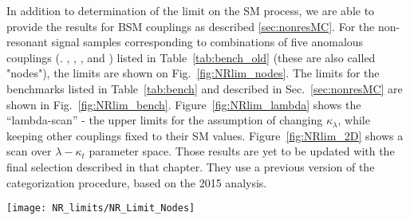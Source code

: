 

In addition to determination of the limit on the SM process, we are
able to provide the results for BSM couplings as described
\ref{sec:nonresMC}.  For the non-resonant signal samples corresponding
to combinations of five anomalous couplings (\kapl. \kapt, \ctwo,
\ctwog, and \cg) listed in Table~\ref{tab:bench_old} (these are also
called "nodes"), the limits are shown on Fig.~\ref{fig:NRlim_nodes}.
The limits for the benchmarks listed in Table~\ref{tab:bench} and
described in Sec.~\ref{sec:nonresMC} are shown in
Fig.~\ref{fig:NRlim_bench}.  Figure~\ref{fig:NRlim_lambda} shows the
``lambda-scan'' - the upper limits for the assumption of changing
$\kappa_\lambda$, while keeping other couplings fixed to their SM
values. Figure~\ref{fig:NRlim_2D} shows a scan over $\lambda-\kappa_t$
parameter space. 
Those results are yet to be updated with the final selection described in that chapter. 
They use a previous version of the categorization procedure, based on the 2015 analysis.

% 

\begin{figure*}[h]
  \centering
  \texttt{[image: NR\_limits/NR\_Limit\_Nodes]}\hfil
  \caption{Limits for Nodes specified in Table~\ref{tab:bench_old}.}
  \label{fig:NRlim_nodes}
\end{figure*}

